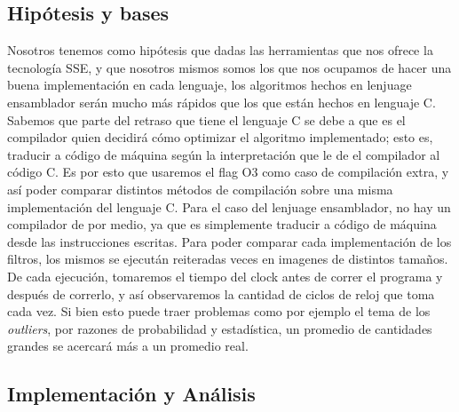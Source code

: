 \documentclass[a4paper]{article}
\begin{document}
\subsection{Hipótesis y bases}
Nosotros tenemos como hipótesis que dadas las herramientas que nos ofrece la tecnología SSE, y que nosotros mismos somos los que nos
ocupamos de hacer una buena implementación en cada lenguaje, los algoritmos hechos en lenjuage ensamblador serán mucho más rápidos
que los que están hechos en lenguaje C. Sabemos que parte del retraso que tiene el lenguaje C se debe a que es el compilador quien decidirá cómo
optimizar el algoritmo implementado; esto es, traducir a código de máquina según la interpretación que le de el compilador al código C. Es por esto
que usaremos el flag O3 como caso de compilación extra, y así poder comparar distintos métodos de compilación sobre una misma
implementación del lenguaje C.
Para el caso del lenjuage ensamblador, no hay un compilador de por medio, ya que es simplemente traducir a código de máquina desde las instrucciones
escritas.
\newline
Para poder comparar cada implementación de los filtros, los mismos se ejecután reiteradas veces en imagenes de distintos tamaños.
De cada ejecución, tomaremos el tiempo del clock antes de correr el programa y después de correrlo, y así observaremos
la cantidad de ciclos de reloj que toma cada vez. Si bien esto puede traer problemas como por ejemplo el tema de los \textit{outliers},
por razones de probabilidad y estadística, un promedio de cantidades grandes se acercará más a un promedio real.

\subsection{Implementación y Análisis}
\end{document}
